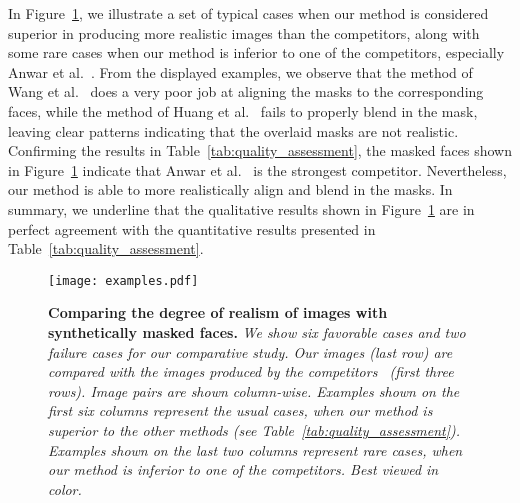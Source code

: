 \documentclass{article}
\begin{document}
In Figure~\ref{fig:realistic-comparison}, we illustrate a set of typical cases when our method is considered superior in producing more realistic images than the competitors, along with some rare cases when our method is inferior to one of the competitors, especially Anwar et al.~\cite{anwar2020arxiv}. From the displayed examples, we observe that the method of Wang et al.~\cite{wang2020arxiv} does a very poor job at aligning the masks to the corresponding faces, while the method of Huang et al.~\cite{huang2021icassp} fails to properly blend in the mask, leaving clear patterns indicating that the overlaid masks are not realistic. Confirming the results in Table~\ref{tab:quality_assessment}, the masked faces shown in Figure~\ref{fig:realistic-comparison} indicate that Anwar et al.~\cite{anwar2020arxiv} is the strongest competitor. Nevertheless, our method is able to more realistically align and blend in the masks. In summary, we underline that the qualitative results shown in Figure~\ref{fig:realistic-comparison} are in perfect agreement with the quantitative results presented in Table~\ref{tab:quality_assessment}.






\begin{figure}
    \centering
    \texttt{[image: examples.pdf]}


    
















 \vspace{-0.2cm}   
    \caption{{\bf Comparing the degree of realism of images with synthetically masked faces. } \emph {We show six favorable cases and two failure cases for our comparative study. Our images (last row) are compared with the images produced by the competitors~\cite{wang2020arxiv,anwar2020arxiv,huang2021icassp} (first three rows). Image pairs are shown column-wise.  Examples shown on the first six columns represent the usual cases, when our method is superior to the other methods (see Table~\ref{tab:quality_assessment}). Examples shown on the last two columns represent rare cases, when our method is inferior to one of the competitors. Best viewed in color.}}
    \label{fig:realistic-comparison}
\end{figure}
\end{document}
